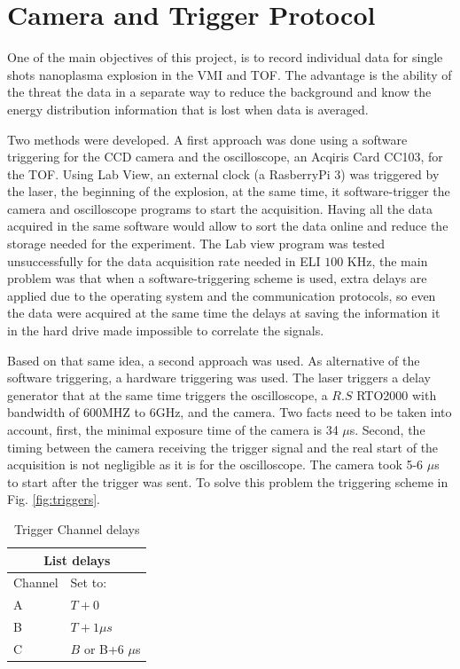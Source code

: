 \section{Camera and Trigger Protocol}

One of the main objectives of this project, is to record individual data for single shots nanoplasma explosion in the VMI and TOF. The advantage is the ability of the threat the data in a separate way to reduce the background and know the energy distribution information that is lost when data is averaged.

Two methods were developed. A first approach was done using a software triggering for the CCD camera and the oscilloscope, an Acqiris Card CC103, for the TOF. Using Lab View, an external clock (a RasberryPi 3) was triggered by the laser, the beginning of the explosion, at the same time, it software-trigger the camera and oscilloscope programs to start the acquisition. Having all the data acquired in the same software would allow to sort the data online and reduce the storage needed for the experiment. The Lab view program was tested unsuccessfully for the data acquisition rate needed in ELI $100$ KHz, the main problem was that when a software-triggering scheme is used, extra delays are applied due to the operating system and the communication protocols, so even the data were acquired at the same time the delays at saving the information it in the hard drive made impossible to correlate the signals.

Based on that same idea, a second approach was used. As alternative of the software triggering, a hardware triggering was used. The laser triggers a delay generator that at the same time triggers the oscilloscope, a $R.S$ RTO2000 with bandwidth of 600MHZ to 6GHz, and the camera. Two facts need to be taken into account, first, the minimal exposure time of the camera is 34 $\mu$s. Second, the timing between the camera receiving the trigger signal and the real start of the acquisition is not negligible as it is for the oscilloscope. The camera took 5-6 $\mu$s to start after the trigger was sent. To solve this problem the triggering scheme in Fig. \ref{fig:triggers}.

\begin{table}[t]

\centering
\begin{tabular}{ll}
\multicolumn{2}{c}{List delays}                                          \\ \hline
\multicolumn{1}{|l|}{Channel} & \multicolumn{1}{l|}{Set to:}    \\ \hline
\multicolumn{1}{|l|}{A}                & \multicolumn{1}{l|}{$T+0$}       \\ \hline
\multicolumn{1}{|l|}{B}                & \multicolumn{1}{l|}{$T+1\mu s$}     \\ \hline
\multicolumn{1}{|l|}{C}                & \multicolumn{1}{l|}{$B$ or B+6 $\mu$s} \\ \hline
\end{tabular}
\caption[trigger Channel delays]{Trigger Channel delays}
\label{tab:delaystriger}
\end{table}

